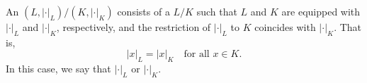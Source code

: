 \begin{definition} \label{definition:extension_of_absolute_valued_fields}
An  $(L, |\cdot|_L)/(K, |\cdot|_K)$ consists of a  $L/K$ such that $L$ and $K$ are equipped with  $|\cdot|_L$ and $|\cdot|_K$, respectively, and the restriction of $|\cdot|_L$ to $K$ coincides with $|\cdot|_K$. That is, 
\[
|x|_L = |x|_K \quad \text{for all } x \in K.
\]
In this case, we say that $|\cdot|_L$  or  $|\cdot|_K$.
\end{definition}